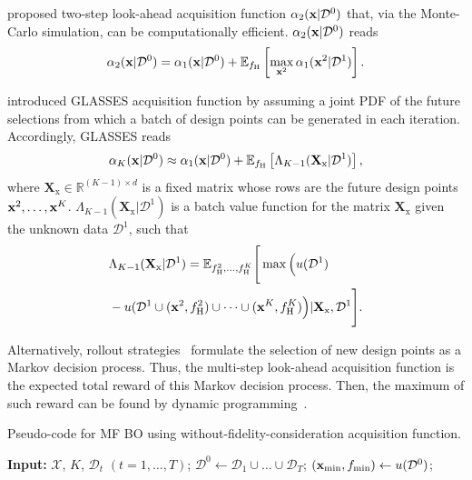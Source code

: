 \documentclass[iicol,sn-basic]{sn-jnl}%
\theoremstyle{thmstyleone}%
\theoremstyle{thmstyletwo}
\theoremstyle{thmstylethree}
\begin{document}
\begin{linenumbers}
\cite{JWu2019} proposed two-step look-ahead acquisition function $\alpha_2({\bf x}|\mathcal{D}^0)$ that, via the Monte-Carlo simulation, can be computationally efficient.
$\alpha_2({\bf x}|\mathcal{D}^0)$ reads
\begin{equation}\label{Eq57}
		\alpha_2({\bf x}|\mathcal{D}^0) =\alpha_1({\bf x}|\mathcal{D}^0) + \mathbb{E}_{f_\text{H}}\left[\underset{{\bf x}^2}{\max}\,\alpha_1({\bf x}^2|\mathcal{D}^1)\right].
\end{equation}

\cite{Gonzalez2016} introduced GLASSES acquisition function by assuming a joint PDF of the future selections from which a batch of design points can be generated in each iteration.
Accordingly, GLASSES reads
\begin{equation}\label{Eq58}
		\alpha_K({\bf x}|\mathcal{D}^0) \approx \alpha_1({\bf x}|\mathcal{D}^0) + \mathbb{E}_{f_\text{H}}\left[\Lambda_{K-1}(\textbf{X}_\text{x}|\mathcal{D}^1)\right],
\end{equation}
where 
$\textbf{X}_\text{x} \in \mathbb{R}^{(K-1) \times d}$ is a fixed matrix whose rows are the future design points ${\bf x}^2,\dots,{\bf x}^K$. $\Lambda_{K-1}(\textbf{X}_\text{x}|\mathcal{D}^1)$ is a batch value function for the matrix  $\textbf{X}_\text{x}$ given the unknown data $\mathcal{D}^1$, such that 
\begin{equation}\label{Eq59}
	\begin{aligned}
	& \Lambda_{K-1}(\textbf{X}_\text{x}|\mathcal{D}^1) =\mathbb{E}_{f_\text{H}^2,\dots,f_\text{H}^K}\Bigg[\max\Big(u(\mathcal{D}^1)\\
	& -u( \mathcal{D}^1 \cup  ({\bf x}^2,f_\text{H}^2) \cup \cdots \cup  ({\bf x}^K,f_\text{H}^K) \Big)|\textbf{X}_\text{x},\mathcal{D}^1\Bigg].
	\end{aligned}
\end{equation}

Alternatively, rollout strategies~\citep{Lam2016,Lee2020,Paulson2022} formulate the selection of new design points as a Markov
decision process.
Thus, the multi-step look-ahead acquisition function is the expected total reward of this Markov
decision process.
Then, the maximum of such reward can be found by dynamic programming~\citep{Rao2019}.

\begin{algorithm}
	\caption{Pseudo-code for MF BO using without-fidelity-consideration acquisition function.}\label{Algo3}
	\begin{algorithmic}[1]
		\State \textbf{Input:} $\mathcal{X}$, $K$, $\mathcal{D}_t$ $(t=1,\dots,T)$;
		\State $\mathcal{D}^0 \gets \mathcal{D}_1 \cup \dots \cup \mathcal{D}_T$;
		\State $({\bf x}_{\min},f_{\min}) \gets u(\mathcal{D}^0)$;
		

\end{algorithmic}
\end{algorithm}
\end{linenumbers}
\end{document}
